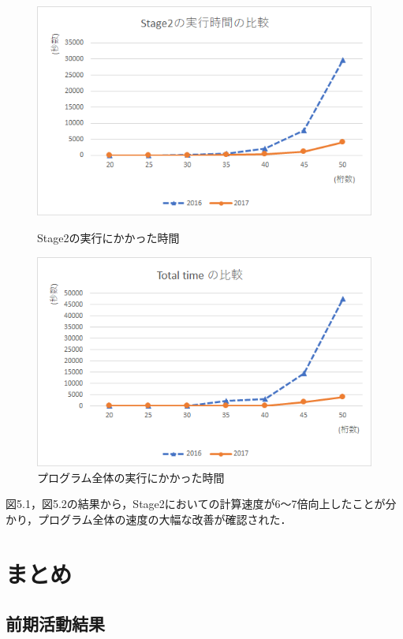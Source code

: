 \documentclass[openany,11pt,papersize]{jsbook}
\begin{document}
\begin{figure}[htbp]
\begin{center}
\includegraphics[width=12cm]{Stage2.png}
\end{center}
\caption{Stage2の実行にかかった時間}
\label{fig:Stage2}
\begin{center}
\includegraphics[width=12cm]{Total_time.png}
\end{center}
\caption{プログラム全体の実行にかかった時間}
\label{fig:prog}
\end{figure}

図5.1，図5.2の結果から，Stage2においての計算速度が6～7倍向上したことが分かり，プログラム全体の速度の大幅な改善が確認された．\par


\chapter{まとめ}

\section{前期活動結果}
\end{document}
